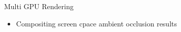 \documentclass{beamer}
\begin{document}
\begin{frame}{Multi GPU Rendering}
	\begin{itemize}
		\item Compositing screen cpace ambient occlusion results
		\begin{figure}
			\centering
\end{figure}
\end{itemize}
\end{frame}
\end{document}
